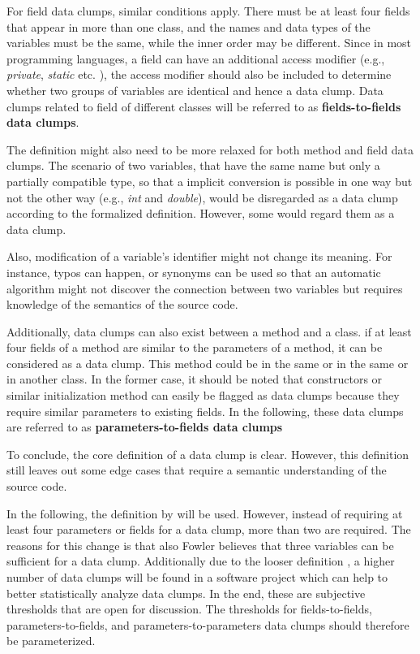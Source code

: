 For field data clumps, similar conditions apply. There must be at least four fields that appear in more than one class, and the names and data types of the variables must be the same, while the inner order may be different. Since in most programming languages, a field can have an additional access modifier (e.g., \textit{private}, \textit{static} etc. ), the access modifier should also be included to determine whether two groups of variables are identical and hence a data clump.  Data clumps related to field of different classes will be referred to as \textbf{fields-to-fields data clumps}. 

The definition might also need to be more relaxed for both method and field data clumps. The scenario of two variables, that have the same name but only a partially compatible type, so that a implicit conversion is possible in one way but not the other way (e.g., \textit{int} and  \textit{double}), would be disregarded as a data clump according to the formalized definition. However, some would regard them as a data clump.

Also, modification of a variable's identifier might not change its meaning. For instance, typos can happen, or synonyms can be used so that an automatic algorithm might not discover the connection between two variables but requires knowledge of the semantics of the source code. \cite{zhangImprovingPrecisionFowler2008}

Additionally, data clumps can also exist between a method and a class. if at least four fields of a method are similar to the parameters of a method, it can be considered as a data clump. This method could be in the same or in the same or in another class. In the former case, it should be noted that constructors or similar initialization method can easily be flagged as data clumps because they require similar parameters to existing fields. In the following, these data clumps are referred to as \textbf{parameters-to-fields data clumps}

To conclude, the core definition of a data clump is clear. However, this definition still leaves out some edge cases that require a semantic understanding of the source code. 



In the following, the definition by \cite{zhangImprovingPrecisionFowler2008} will be used. However,  instead of requiring at least four parameters or fields for a data clump, more than two are required. The reasons for this change is that also Fowler believes that three variables can be sufficient for a data clump. Additionally due to the looser definition , a higher number of data clumps will be found in a software project which can help to better statistically analyze data clumps. In the end, these are subjective thresholds that are open for discussion. The thresholds for fields-to-fields, parameters-to-fields, and parameters-to-parameters data clumps should therefore be parameterized.



